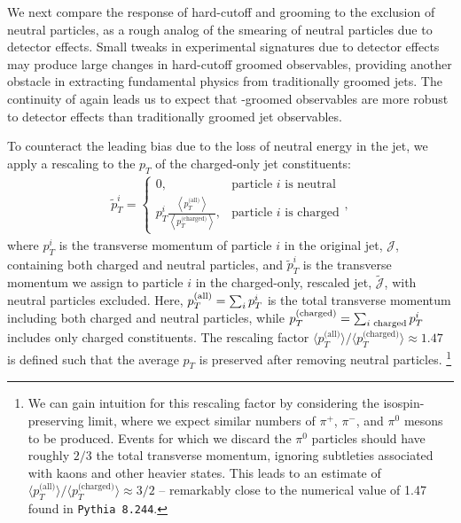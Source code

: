We next compare the response of hard-cutoff and \PIRANHA{} grooming to the exclusion of neutral particles, as a rough analog of the smearing of neutral particles due to detector effects.
%
Small tweaks in experimental signatures due to detector effects may produce large changes in hard-cutoff groomed observables, providing another obstacle in extracting fundamental physics from traditionally groomed jets.
%
The continuity of \PIRANHA{} again leads us to expect that \PIRANHA{}-groomed observables are more robust to detector effects than traditionally groomed jet observables.


To counteract the leading bias due to the loss of neutral energy in the jet, we apply a rescaling to the \(p_T\) of the charged-only jet constituents:
%
\begin{align}
    \tilde p_T^i =
    \begin{cases}
        0,
        &\text{particle }i\text{ is neutral}
        \\
        p_T^i
        \frac{\left\langle p_T^\text{(all)}\right\rangle}{\left\langle p_T^\text{(charged)}\right\rangle},
        &\text{particle }i\text{ is charged}
    \end{cases}
    ,
    \label{eqn:all-charged_rescaling}
\end{align}
where \(p_T^i\) is the transverse momentum of particle \(i\) in the original jet, \(\mathcal{J}\), containing both charged and neutral particles, and \(\tilde p_T^i\) is the transverse momentum we assign to particle \(i\) in the charged-only, rescaled jet, \(\tilde{\mathcal{J}}\), with neutral particles excluded.
%
Here, \(p_T^{\rm(all)} = \sum_i p_T^i\) is the total transverse momentum including both charged and neutral particles, while \(p_T^{\rm(charged)} = \sum_{i\text{ charged}} p_T^i\) includes only charged constituents.
%
The rescaling factor \(\big\langle p_T^\text{(all)}\big\rangle/\big\langle p_T^\text{(charged)}\big\rangle\)\(\approx\)\(1.47\) is defined such that the average $p_T$ is preserved after removing neutral particles.%
\footnote{
We can gain intuition for this rescaling factor by considering the isospin-preserving limit, where we expect similar numbers of \(\pi^+\), \(\pi^-\), and \(\pi^0\) mesons to be produced.
%
Events for which we discard the \(\pi^0\) particles should have roughly \(2/3\) the total transverse momentum, ignoring subtleties associated with kaons and other heavier states.
%
This leads to an estimate of \(\big\langle p_T^\text{(all)}\big\rangle/\big\langle p_T^\text{(charged)}\big\rangle \approx 3/2\) -- remarkably close to the numerical value of 1.47 found in \texttt{Pythia 8.244}.
}

